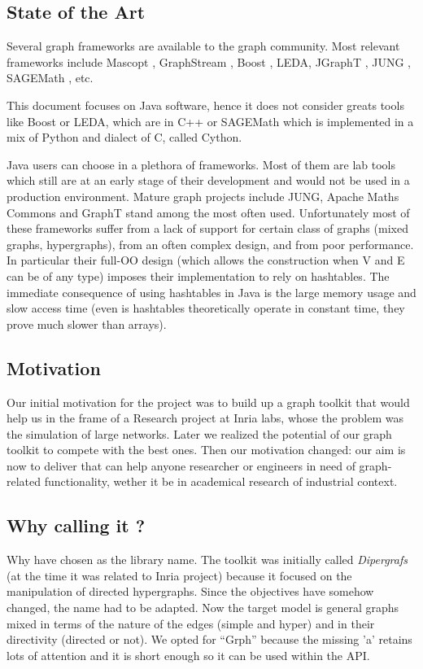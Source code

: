 \documentclass{article}
\begin{document}
\subsection{State of the Art}
Several graph frameworks are available to the graph community. Most relevant
frameworks include
Mascopt \cite{LSV04}, GraphStream \cite{Dutot2007}, Boost \cite{504206}, LEDA,
JGraphT \cite{jgraphtweb}, JUNG \cite{jungweb}, SAGEMath \cite{sageweb}, etc.

This document focuses on Java software, hence it does not  consider greats tools like Boost or LEDA, which are in C++
or SAGEMath which is implemented in a mix of Python and dialect of C, called Cython.

Java users can choose in a plethora of frameworks. Most of them are lab tools which still are at an early stage of their development and would not
be used in a production environment. Mature graph projects include JUNG, Apache Maths Commons and GraphT stand among the most often used.
Unfortunately most of these frameworks suffer from a lack of
support for certain class of graphs (mixed graphs, hypergraphs), from an often complex design, and from poor performance.
In particular their full-OO design (which allows the construction  when V and E can be
of any type) imposes their implementation to rely on hashtables. The immediate consequence of using hashtables in Java
is the large memory usage and slow access time (even is hashtables  theoretically operate in constant time, they prove
 much slower than arrays).  

\subsection{Motivation}
Our initial motivation for the \grph project was to build up a graph toolkit that would help us in the frame of
a Research project at Inria labs, whose the problem was the simulation of large networks. Later we realized the potential
of our graph toolkit to compete with the best ones. 
Then our motivation changed: our aim is now to deliver that can help anyone researcher or engineers in need of graph-related
functionality, wether it be in academical research of industrial context.

\subsection{Why calling it \grph?}
Why have chosen \grph as the library name. The toolkit was initially called \textit{Dipergrafs} (at the time it was related to Inria project) because it focused on
the manipulation of directed hypergraphs. Since the objectives have somehow changed, the name had to be adapted.
Now the target model is general graphs mixed in terms of the nature of the edges (simple and hyper) and in their
directivity (directed or not). We opted for ``Grph'' because the missing 'a' retains lots of attention and  it is short enough
so it can be used within the API.
\end{document}

